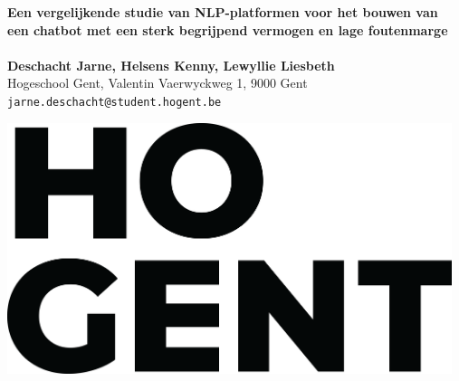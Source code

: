 \documentclass[a0,portrait]{a0poster}
\begin{document}


\begin{minipage}[t]{0.75\linewidth}
\VeryHuge \color{HoGentAccent1} \textbf{Een vergelijkende studie van NLP-platformen voor het bouwen van een chatbot met een sterk begrijpend vermogen en lage foutenmarge} \color{Black}\\ %
\Huge\textit{}\\[2.4cm] %
\huge \textbf{Deschacht Jarne, Helsens Kenny, Lewyllie Liesbeth}\\[0.5cm] %
\huge Hogeschool Gent, Valentin Vaerwyckweg 1, 9000 Gent\\[0.4cm] %
\Large \texttt{jarne.deschacht@student.hogent.be} \\
\end{minipage}
%
\begin{minipage}[t]{0.25\linewidth}
\includegraphics[width=13cm,right]{figures/HOGENT_Logo_Pos_rgb.png} 

\end{minipage}

\vspace{1cm} %

\end{document}
